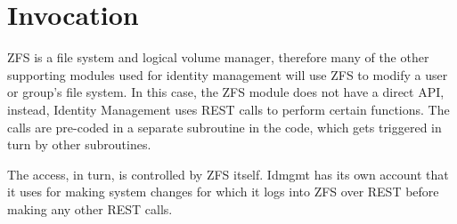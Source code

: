 \section{Invocation}

ZFS is a file system and logical volume manager, therefore many of the other supporting modules used for identity management will use ZFS to modify a user or group's file system. In this case, the ZFS module does not have a direct API, instead, Identity Management uses REST calls to perform certain functions. The calls are pre-coded in a separate subroutine in the code, which gets triggered in turn by other subroutines.  

The access, in turn, is controlled by ZFS itself. Idmgmt has its own account that it uses for making system changes for which it logs into ZFS over REST before making any other REST calls. 
